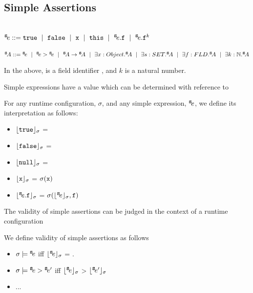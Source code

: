  \subsection{Simple Assertions}
 \label{def:simple_assertion}
 \begin{definition} $ $ \\
 
 $ \SE ::=  \prg{true}  \ \mid\ \prg{false}  \ \mid \ \prg{x}  \ \mid\ \prg{this}  \ \mid \ \SE.\prg{f} \  \mid \ \SE.\prg{f} ^{k}    $

$ \SA ::= \SE  \ \mid \ \SE > \SE \ \mid \ \SA \rightarrow \SA \ \mid \ \exists x:Object.\SA  \ \mid \  \exists s:SET.\SA  \ \mid \  \exists f:FLD.\SA
 \ \mid \  \exists k:\mathbb{N}.\SA $ 

\noindent
In the above,  is a field identifier , and  $k$ is a natural number.
\end{definition} 

Simple expressions have a value which can be determined with reference to 

\begin{definition}[Interpretations]

For any runtime configuration, $\sigma$, and any simple expression, ${^{\small{{\mbox{\tt{s}}}}}\!e}$, we define its interpretation as follows:

\begin{itemize}
     \item 
  ${\lfloor{ {{\mbox{\tt{true}}}}}\rfloor_{\sigma}}$ = 
  \item
  ${\lfloor{ {{\mbox{\tt{false}}}}}\rfloor_{\sigma}}$ = 
 \item
  ${\lfloor{ {{\mbox{\tt{null}}}}}\rfloor_{\sigma}}$ = 
  \item
  ${\lfloor{ {{\mbox{\tt{x}}}}}\rfloor_{\sigma}}$ = $\sigma({\mbox{\tt{x}}})$
  \item
  ${\lfloor{ {\ensuremath{{^{\small{{\mbox{\tt{s}}}}}\!e}}.{\mbox{\tt{f}}}}}\rfloor_{\sigma}}$ = $\sigma({{\lfloor{ {\ensuremath{{^{\small{{\mbox{\tt{s}}}}}\!e}}}}\rfloor_{\sigma}}}, {\mbox{\tt{f}}})$
   \end{itemize}
\end{definition}


The validity of simple assertions can be judged in the context of a runtime configuration

 \begin{definition}
We define validity of simple assertions as follows

\begin{itemize}
\item
$\sigma \models {^{\small{{\mbox{\tt{s}}}}}\!e}$ iff ${\lfloor{ {\ensuremath{{^{\small{{\mbox{\tt{s}}}}}\!e}}}}\rfloor_{\sigma}}$ = .
\item
$\sigma \models {^{\small{{\mbox{\tt{s}}}}}\!e}>{^{\small{{\mbox{\tt{s}}}}}\!e'}$ iff ${\lfloor{ {\ensuremath{{^{\small{{\mbox{\tt{s}}}}}\!e}}}}\rfloor_{\sigma}}$ > ${\lfloor{ {\ensuremath{{^{\small{{\mbox{\tt{s}}}}}\!e'}}}}\rfloor_{\sigma}}$
\item
...
\end{itemize}
\end{definition}

